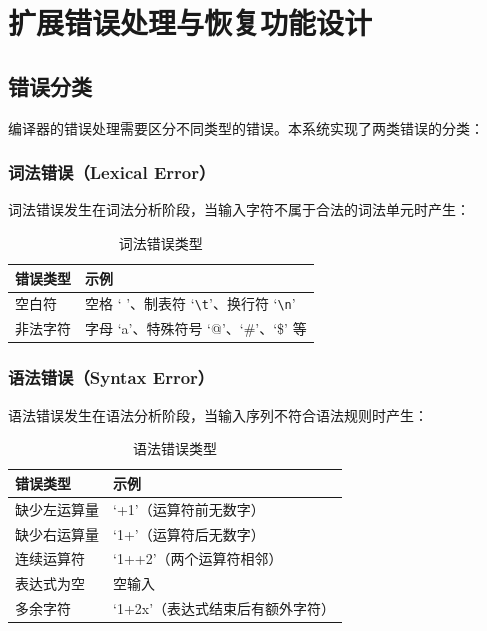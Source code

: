 \documentclass[a4paper]{article}
\begin{document}
\section{扩展错误处理与恢复功能设计}

\subsection{错误分类}

编译器的错误处理需要区分不同类型的错误。本系统实现了两类错误的分类：

\subsubsection{词法错误（Lexical Error）}

词法错误发生在词法分析阶段，当输入字符不属于合法的词法单元时产生：

\begin{table}[H]
\centering
\begin{tabular}{ll}
\toprule
\textbf{错误类型} & \textbf{示例} \\
\midrule
空白符 & 空格 ` '、制表符 `\texttt{\textbackslash t}'、换行符 `\texttt{\textbackslash n}' \\
非法字符 & 字母 `a'、特殊符号 `@'、`\#'、`\$' 等 \\
\bottomrule
\end{tabular}
\caption{词法错误类型}
\end{table}

\subsubsection{语法错误（Syntax Error）}

语法错误发生在语法分析阶段，当输入序列不符合语法规则时产生：

\begin{table}[H]
\centering
\begin{tabular}{ll}
\toprule
\textbf{错误类型} & \textbf{示例} \\
\midrule
缺少左运算量 & `+1'（运算符前无数字） \\
缺少右运算量 & `1+'（运算符后无数字） \\
连续运算符 & `1++2'（两个运算符相邻） \\
表达式为空 & 空输入 \\
多余字符 & `1+2x'（表达式结束后有额外字符） \\
\bottomrule
\end{tabular}
\caption{语法错误类型}
\end{table}
\end{document}
